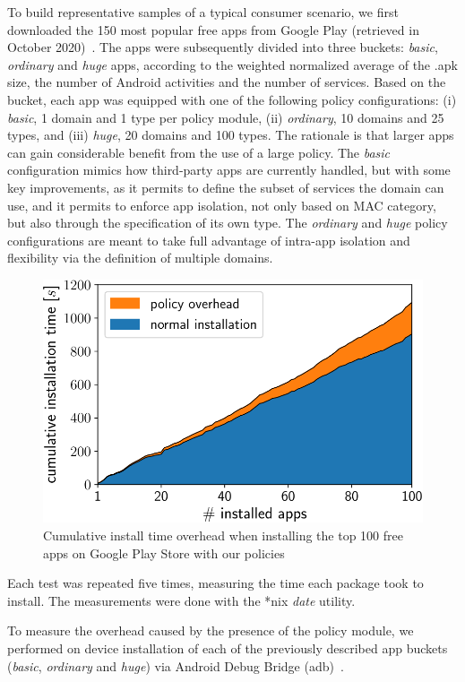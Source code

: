 To build representative samples of a typical consumer scenario, we
first downloaded the 150 most popular free apps from Google Play
(retrieved in October 2020)~\cite{seapp_topapps}.  The apps were
subsequently divided into three buckets: \emph{basic}, \emph{ordinary}
and \emph{huge} apps, according to the weighted normalized average of
the .apk size, the number of Android activities and the number of
services.  Based on the bucket, each app was equipped with one of the
following policy configurations: (i) \emph{basic}, 1 domain and 1 type
per policy module, (ii) \emph{ordinary}, 10 domains and 25 types, and
(iii) \emph{huge}, 20 domains and 100 types.  The rationale is that
larger apps can gain considerable benefit from the use of a large
policy.  The \emph{basic} configuration mimics how third-party apps
are currently handled, but with some key improvements, as it permits
to define the subset of services the domain can use, and it permits to
enforce app isolation, not only based on MAC category, but also
through the specification of its own type.  The \emph{ordinary} and
\emph{huge} policy configurations are meant to take full advantage of
intra-app isolation and flexibility via the definition of multiple
domains.
%
\begin{figure}[t]
	\centering
	\includegraphics[width=0.7\columnwidth]{chapters/seapp/data/top100_cumulative}
	\caption{\label{fig:seapp_benchmark100} Cumulative install time
          overhead when installing the top 100 free apps on Google
          Play Store with our policies}
\end{figure}
%
Each test was repeated five times, measuring the time each package
took to install.  The measurements were done with the *nix {\em date}
utility.

To measure the overhead caused by the presence of the policy module,
we performed on device installation of each of the previously
described app buckets (\emph{basic}, \emph{ordinary} and \emph{huge})
via Android Debug Bridge (adb)~\cite{seapp_adblink}.

